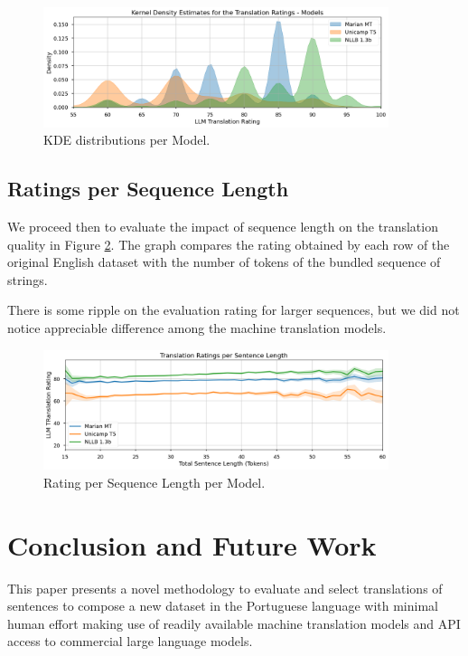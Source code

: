 \documentclass[runningheads]{llncs}
\begin{document}
\begin{figure}[htbp]
    \centering
    \includegraphics[width=0.9\textwidth]{figures/kde.png}
    \caption{KDE distributions per Model.}\label{fig:kde}
\end{figure}
\FloatBarrier

\subsection{Ratings per Sequence Length}

We proceed then to evaluate the impact of sequence length on the translation
quality in Figure \ref{fig:line-chart}. The graph compares the rating obtained
by each row of the original English dataset with the number of tokens of the
bundled sequence of strings. 

There is some ripple on the evaluation rating for larger sequences, but we did
not notice appreciable difference among the machine translation models.

\begin{figure}[htpb]
    \centering
    \includegraphics[width=0.9\textwidth]{figures/line-chart.png}
    \caption{Rating per Sequence Length per Model.}\label{fig:line-chart}
\end{figure}

\section{Conclusion and Future Work}

This paper presents a novel methodology to evaluate and select translations of sentences to compose a new dataset in the Portuguese language with minimal human effort making use of readily available machine translation models and API access to commercial large language models.
\end{document}
